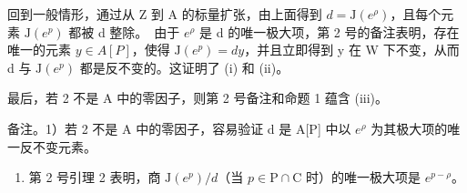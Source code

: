 回到一般情形，通过从 Z 到 A 的标量扩张，由上面得到 \(d = \mathrm{J}(e^{\rho})\)，且每个元素 \(\mathrm{J}(e^{p})\) 都被 d 整除。~由于 \(e^{\rho}\) 是 d 的唯一极大项，第 2 号的备注表明，存在唯一的元素 \(y \in A[P]\)，使得 \(\mathrm{J}(e^{p}) = dy\)，并且立即得到 y 在 W 下不变，从而 d 与 \(\mathrm{J}(e^{p})\) 都是反不变的。这证明了 (i) 和 (ii)。

最后，若 2 不是 A 中的零因子，则第 2 号备注和命题 1 蕴含 (iii)。

备注。1）若 2 不是 A 中的零因子，容易验证 d 是 A{[}P{]} 中以 \(e^{\rho}\) 为其极大项的唯一反不变元素。

\begin{enumerate}
\def\labelenumi{\arabic{enumi})}
\setcounter{enumi}{1}
\tightlist
\item
  第 2 号引理 2 表明，商 \(\mathrm{J}(e^p) / d\)（当 \(p\in \mathrm{P}\cap \mathrm{C}\) 时）的唯一极大项是 \(e^{p - \rho}\)。
\end{enumerate}


